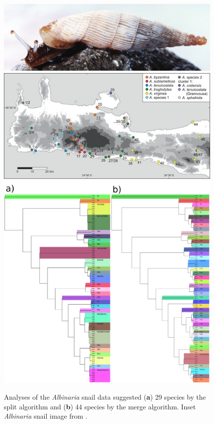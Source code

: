 \documentclass[A4]{article1}
\begin{document}
\begin{figure}[h]
  \centering %
  \includegraphics[scale=0.05]{figs/fig-snail}
  \includegraphics[scale=0.50]{figs/fig-snail-crete}
  \includegraphics[scale=0.06]{figs/fig-snail-results}
  
  \caption{Analyses of the \textit{Albinaria} snail data suggested (\textbf{a}) 29
   species by the split algorithm and (\textbf{b}) 44 species by the merge algorithm. 
   Inset \textit{Albinaria} snail image from \cite[][fig.~3A]{Schilthuizen2018}. %
} \label{fig:snail}
\end{figure}
\end{document}
